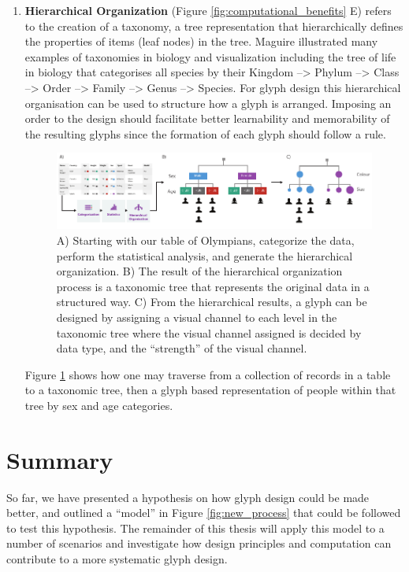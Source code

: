 \begin{enumerate}
\item \textbf{Hierarchical Organization} (Figure \ref{fig:computational_benefits} E) refers to the creation of a taxonomy, a tree representation that hierarchically defines the properties of items (leaf nodes) in the tree.
Maguire illustrated many examples of taxonomies in biology and visualization \cite{maguire12} including the tree of life in biology that categorises all species by their Kingdom --> Phylum --> Class --> Order --> Family --> Genus --> Species. 
For glyph design this hierarchical organisation can be used to structure how a glyph is arranged.
Imposing an order to the design should facilitate better learnability and memorability of the resulting glyphs since the formation of each glyph should follow a rule.

\begin{figure}[h!]
\centering
\includegraphics[width=\textwidth]{images/ch3/table_tax_glyph}
\caption{A) Starting with our table of Olympians, categorize the data, perform the statistical analysis, and generate the hierarchical organization.
B) The result of the hierarchical organization process is a taxonomic tree that represents the original data in a structured way.
C) From the hierarchical results, a glyph can be designed by assigning a visual channel to each level in the taxonomic tree where the visual channel assigned is decided by data type, and the ``strength'' of the visual channel.}
\label{fig:taxonomic_glyph_design}
\end{figure}

Figure \ref{fig:taxonomic_glyph_design} shows how one may traverse from a collection of records in a table to a taxonomic tree, then a glyph based representation of people within that tree by sex and age categories.

\end{enumerate}

\section{Summary}

So far, we have presented a hypothesis on how glyph design could be made better, and outlined a ``model'' in Figure \ref{fig:new_process} that could be followed to test this hypothesis.
The remainder of this thesis will apply this model to a number of scenarios and investigate how design principles and computation can contribute to a more systematic glyph design.


